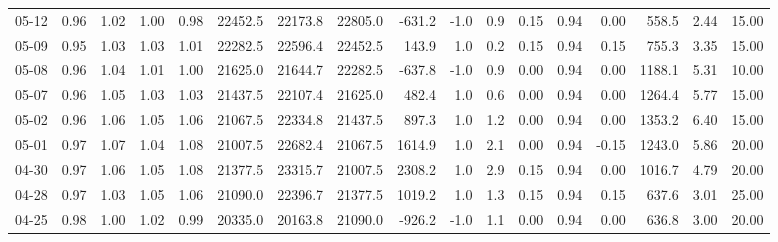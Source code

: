 \begin{threeparttable}
{\begin{tabular}{lrrrrrrrrrrrrrrrr}
  05-12 &         0.96 &           1.02 &          1.00 &          0.98 & 22452.5 & 22173.8 & 22805.0 &     -631.2 &                     -1.0 &                 0.9 &       0.15 &      0.94 &           0.00 &            558.5 &            2.44 &                  15.00 \\
  05-09 &         0.95 &           1.03 &          1.03 &          1.01 & 22282.5 & 22596.4 & 22452.5 &      143.9 &                      1.0 &                 0.2 &       0.15 &      0.94 &           0.15 &            755.3 &            3.35 &                  15.00 \\
  05-08 &         0.96 &           1.04 &          1.01 &          1.00 & 21625.0 & 21644.7 & 22282.5 &     -637.8 &                     -1.0 &                 0.9 &       0.00 &      0.94 &           0.00 &           1188.1 &            5.31 &                  10.00 \\
  05-07 &         0.96 &           1.05 &          1.03 &          1.03 & 21437.5 & 22107.4 & 21625.0 &      482.4 &                      1.0 &                 0.6 &       0.00 &      0.94 &           0.00 &           1264.4 &            5.77 &                  15.00 \\
  05-02 &         0.96 &           1.06 &          1.05 &          1.06 & 21067.5 & 22334.8 & 21437.5 &      897.3 &                      1.0 &                 1.2 &       0.00 &      0.94 &           0.00 &           1353.2 &            6.40 &                  15.00 \\
  05-01 &         0.97 &           1.07 &          1.04 &          1.08 & 21007.5 & 22682.4 & 21067.5 &     1614.9 &                      1.0 &                 2.1 &       0.00 &      0.94 &          -0.15 &           1243.0 &            5.86 &                  20.00 \\
  04-30 &         0.97 &           1.06 &          1.05 &          1.08 & 21377.5 & 23315.7 & 21007.5 &     2308.2 &                      1.0 &                 2.9 &       0.15 &      0.94 &           0.00 &           1016.7 &            4.79 &                  20.00 \\
  04-28 &         0.97 &           1.03 &          1.05 &          1.06 & 21090.0 & 22396.7 & 21377.5 &     1019.2 &                      1.0 &                 1.3 &       0.15 &      0.94 &           0.15 &            637.6 &            3.01 &                  25.00 \\
  04-25 &         0.98 &           1.00 &          1.02 &          0.99 & 20335.0 & 20163.8 & 21090.0 &     -926.2 &                     -1.0 &                 1.1 &       0.00 &      0.94 &           0.00 &            636.8 &            3.00 &                  20.00 \\

\end{tabular}}
\end{threeparttable}
